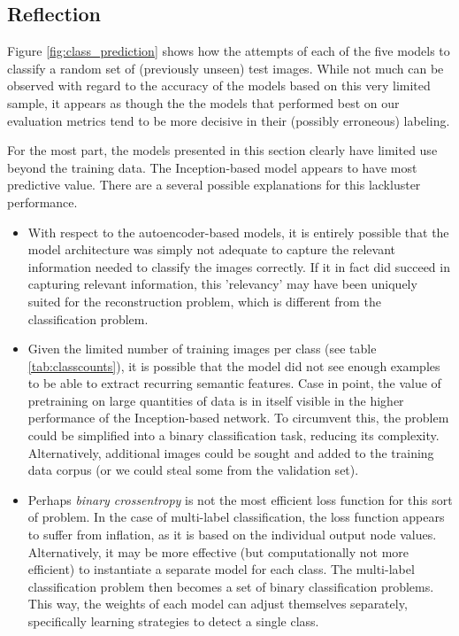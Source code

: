 

\subsection{Reflection} Figure \ref{fig:class_prediction} shows how the attempts of each of the five models to classify a random set of (previously unseen) test images. While not much can be observed with regard to the accuracy of the models based on this very limited sample, it appears as though the the models that performed best on our evaluation metrics tend to be more decisive in their (possibly erroneous) labeling.

For the most part, the models presented in this section clearly have limited use beyond the training data. The Inception-based model appears to have most predictive value. There are a several possible explanations for this lackluster performance.

\begin{itemize}

	\item{With respect to the autoencoder-based models, it is entirely possible that the model architecture was simply not adequate to capture the relevant information needed to classify the images correctly. If it in fact did succeed in capturing relevant information, this 'relevancy' may have been uniquely suited for the reconstruction problem, which is different from the classification problem.}
	
	\item{Given the limited number of training images per class (see table \ref{tab:classcounts}), it is possible that the model did not see enough examples to be able to extract recurring semantic features. Case in point, the value of pretraining on large quantities of data is in itself visible in the higher performance of the Inception-based network. To circumvent this, the problem could be simplified into a binary classification task, reducing its complexity. Alternatively, additional images could be sought and added to the training data corpus (or we could steal some from the validation set).}
	
	\item{Perhaps \textit{binary crossentropy} is not the most efficient loss function for this sort of problem. In the case of multi-label classification, the loss function appears to suffer from inflation, as it is based on the individual output node values. Alternatively, it may be more effective (but computationally not more efficient) to instantiate a separate model for each class. The multi-label classification problem then becomes a set of binary classification problems. This way, the weights of each model can adjust themselves separately, specifically learning strategies to detect a single class.}

\end{itemize}
